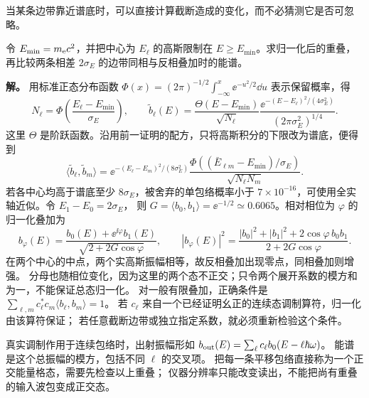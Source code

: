 当某条边带靠近谱底时，可以直接计算截断造成的变化，而不必猜测它是否可忽略。
\begin{exbox}[谱底截断与两条相干边带的归一化]
令 $E_{\min}=m_{\rm e}c^2$，并把中心为 $E_\ell$ 的高斯限制在
$E\ge E_{\min}$。求归一化后的重叠，再比较两条相差 $2\sigma_E$ 的边带同相与反相叠加时的能谱。

\textbf{解。} 用标准正态分布函数
$\Phi(x)=(2\pi)^{-1/2}\int_{-\infty}^x\ee^{-u^2/2}\dd u$ 表示保留概率，得
\[
N_\ell=\Phi\!\left(\frac{E_\ell-E_{\min}}{\sigma_E}\right),\qquad
\widetilde b_\ell(E)=\frac{\Theta(E-E_{\min})}{\sqrt{N_\ell}}
\frac{\ee^{-(E-E_\ell)^2/(4\sigma_E^2)}}{(2\pi\sigma_E^2)^{1/4}}.
\]
这里 $\Theta$ 是阶跃函数。沿用前一证明的配方，只将高斯积分的下限改为谱底，便得到
\[
\langle\widetilde b_\ell,\widetilde b_m\rangle
=\ee^{-(E_\ell-E_m)^2/(8\sigma_E^2)}
\frac{\Phi((\bar E_{\ell m}-E_{\min})/\sigma_E)}{\sqrt{N_\ell N_m}}.
\]
若各中心均高于谱底至少 $8\sigma_E$，被舍弃的单包络概率小于
$7\times10^{-16}$，可使用全实轴近似。令 $E_1-E_0=2\sigma_E$，
则 $G=\langle b_0,b_1\rangle=\ee^{-1/2}\simeq0.6065$。相对相位为 $\varphi$ 的归一化叠加为
\[
b_\varphi(E)=\frac{b_0(E)+\ee^{\ii\varphi}b_1(E)}{\sqrt{2+2G\cos\varphi}},\qquad
|b_\varphi(E)|^2=
\frac{|b_0|^2+|b_1|^2+2\cos\varphi\,b_0b_1}{2+2G\cos\varphi}.
\]
在两个中心的中点，两个实高斯振幅相等，故反相叠加出现零点，同相叠加则增强。
分母也随相位变化，因为这里的两个态不正交；只令两个展开系数的模方和为一，不能保证总态归一化。
对一般有限叠加，正确条件是
$\sum_{\ell,m}c_\ell^*c_m\langle b_\ell,b_m\rangle=1$。
若 $c_\ell$ 来自一个已经证明幺正的连续态调制算符，归一化由该算符保证；
若任意截断边带或独立指定系数，就必须重新检验这个条件。
\end{exbox}

真实调制作用于连续包络时，出射振幅形如
$b_{\rm out}(E)=\sum_\ell c_\ell b_0(E-\ell\hbar\omega)$。
能谱是这个总振幅的模方，包括不同 $\ell$ 的交叉项。
把每一条平移包络直接称为一个正交能量格态，需要先检查以上重叠；
仪器分辨率只能改变读出，不能把尚有重叠的输入波包变成正交态。

